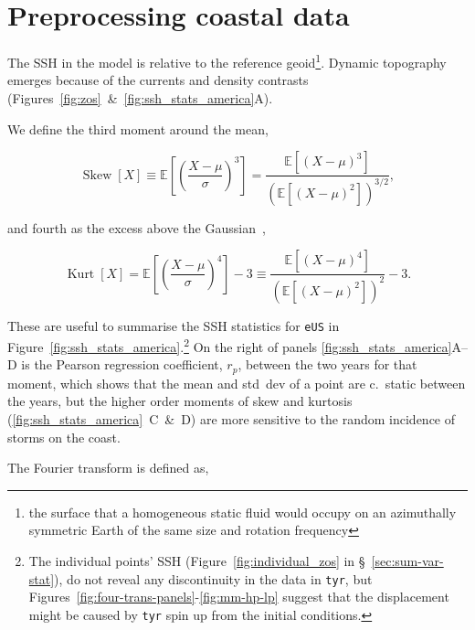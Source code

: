 \section{Preprocessing coastal data}
\label{sec:Preprocessing}
The SSH in the model is relative to
the reference geoid\footnote{the surface that a homogeneous static fluid would occupy
on an azimuthally symmetric Earth of the same size and rotation frequency}.
Dynamic topography emerges because of the
currents and density contrasts (Figures~\ref{fig:zos}~\&~\ref{fig:ssh_stats_america}A).




We define the third  moment around the mean,

\begin{equation}
\operatorname{Skew}[X]\equiv \mathbb{E}\left[\left(\frac{X-\mu}{\sigma}\right)^{3}\right]
=\frac{\mathbb{E}\left[(X-\mu)^{3}\right]}{\left(\mathbb{E}\left[(X-\mu)^{2}\right]\right)^{3 / 2}},
\end{equation}

and fourth as the excess above the Gaussian~\cite{taleb2019statistical},

\begin{equation}
\operatorname{Kurt}[X]=
\mathbb{E}\left[\left(\frac{X-\mu}{\sigma}\right)^{4}\right]-3
\equiv \frac{\mathbb{E}\left[(X-\mu)^{4}\right]}{\left(\mathbb{E}\left[(X-\mu)^{2}\right]\right)^{2}}-3.
\end{equation}






These are useful to summarise the SSH statistics
for \texttt{eUS} in Figure~\ref{fig:ssh_stats_america}.\footnote{
The individual points' SSH (Figure~\ref{fig:individual_zos} in §~\ref{sec:sum-var-stat}),
do not reveal any discontinuity in the data in \texttt{tyr},
 but Figures~\ref{fig:four-trans-panels}-\ref{fig:mm-hp-lp}
suggest that the displacement might be caused by \texttt{tyr} spin up from the
initial conditions.
}
On the right of panels \ref{fig:ssh_stats_america}A--D
is the Pearson regression coefficient, $r_p$,
between the two years for that moment, which shows that the mean and
std~dev of a point are c.~static between the years,
but the higher order moments of skew and kurtosis
(\ref{fig:ssh_stats_america}~C~\&~D) are more sensitive to the
random incidence of storms on the coast.


\label{sec:fourier}

The Fourier transform is defined as,

